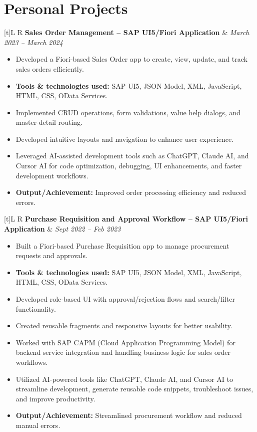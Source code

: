 \documentclass[a4paper,10pt]{article}
\newcommand{\resumeProject}[2]{%
  \vspace{1mm}%
  \noindent\begin{tabularx}{\textwidth}[t]{L R}%
    \textbf{#1} & \textit{#2} \\%
  \end{tabularx}\vspace{-0.5mm}%
}
\begin{document}
\section{Personal Projects}
\resumeProject
  {Sales Order Management -- SAP UI5/Fiori Application}{March 2023 -- March 2024}
\begin{itemize}
  \item Developed a Fiori-based Sales Order app to create, view, update, and track sales orders efficiently.
  \item \textbf{Tools \& technologies used:} SAP UI5, JSON Model, XML, JavaScript, HTML, CSS, OData Services.
  \item Implemented CRUD operations, form validations, value help dialogs, and master-detail routing.
  \item Developed intuitive layouts and navigation to enhance user experience.
  \item Leveraged AI-assisted development tools such as ChatGPT, Claude AI, and Cursor AI for code optimization, debugging, UI enhancements, and faster development workflows.
  \item \textbf{Output/Achievement:} Improved order processing efficiency and reduced errors.
\end{itemize}

\resumeProject
  {Purchase Requisition and Approval Workflow -- SAP UI5/Fiori Application}{Sept 2022 -- Feb 2023}
\begin{itemize}
  \item Built a Fiori-based Purchase Requisition app to manage procurement requests and approvals.
  \item \textbf{Tools \& technologies used:} SAP UI5, JSON Model, XML, JavaScript, HTML, CSS, OData Services.
  \item Developed role-based UI with approval/rejection flows and search/filter functionality.
  \item Created reusable fragments and responsive layouts for better usability.
  \item Worked with SAP CAPM (Cloud Application Programming Model) for backend service integration and handling business logic for sales order workflows.
  \item Utilized AI-powered tools like ChatGPT, Claude AI, and Cursor AI to streamline development, generate reusable code snippets, troubleshoot issues, and improve productivity.
  \item \textbf{Output/Achievement:} Streamlined procurement workflow and reduced manual errors.
\end{itemize}
\end{document}
